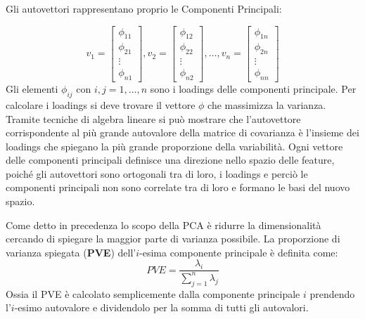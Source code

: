 Gli autovettori rappresentano proprio le Componenti Principali:

\begin{equation*}
	v_1 = \begin{bmatrix}
					\phi_{11}\\
					\phi_{21}\\
					\vdots\\
					\phi_{n1}
				\end{bmatrix},
	v_2 = \begin{bmatrix}
					\phi_{12}\\
					\phi_{22}\\
					\vdots\\
					\phi_{n2}
				\end{bmatrix},
	\dots ,
	v_n = \begin{bmatrix}
					\phi_{1n}\\
					\phi_{2n}\\
					\vdots\\
					\phi_{nn}
			   \end{bmatrix}
\end{equation*}
\newline
Gli elementi  $\phi_{ij}$ con $i,j =1, \dots ,n$ sono i loadings delle componenti principale. Per calcolare i loadings si deve trovare il vettore $\phi$ che massimizza la varianza.
Tramite tecniche di algebra lineare si può mostrare che l'autovettore corrispondente al più grande autovalore della matrice di covarianza è l'insieme dei loadings che spiegano la più grande proporzione della variabilità.
Ogni vettore delle componenti principali definisce una direzione nello spazio delle feature, poiché gli autovettori sono ortogonali tra di loro, i loadings e perciò le componenti principali non sono correlate tra di loro e formano le basi del nuovo spazio.

Come detto in precedenza lo scopo della PCA è ridurre la dimensionalità cercando di spiegare la maggior parte di varianza possibile.
La proporzione di varianza spiegata (\textbf{PVE}) dell'$i$-esima componente principale è definita come: 
\begin{equation*}
	PVE = \frac{\lambda_i}{\sum_{j=1}^{n} \lambda_j}
\end{equation*}
Ossia il PVE è calcolato semplicemente dalla componente principale $i$ prendendo l'$i$-esimo autovalore e dividendolo per la somma di tutti gli autovalori.

